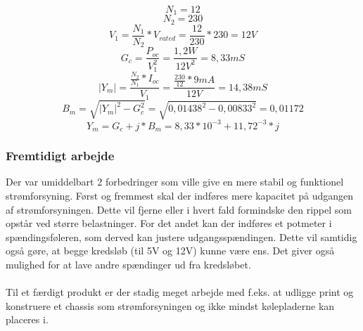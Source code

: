 \begin{equation}
	N_1 = 12
\end{equation}
\begin{equation}
	N_2 = 230
\end{equation}
\begin{equation}
	V_1 = \frac{N_1}{N_2} * V_{rated} = \frac{12}{230} * 230 = 12V
\end{equation}
\begin{equation}
	G_c = \frac{P_{oc}}{V_1^2} = \frac{1,2W}{12V^2} = 8,33mS
\end{equation}
\begin{equation}
	\left|Y_m\right| = \frac{\frac{N_2}{N_1} * I_{oc}}{V_1} = \frac{\frac{230}{12} * 9mA}{12V} = 14,38mS
\end{equation}
\begin{equation}
	B_m = \sqrt{\left|Y_m\right|^2 - G_c^2} = \sqrt{0,01438^2 - 0,00833^2} = 0,01172
\end{equation}
\begin{equation}
	Y_m = G_c + j * B_m = 8,33*10^{-3} + 11,72^{-3} * j
\end{equation}


\subsubsection{Fremtidigt arbejde}
Der var umiddelbart 2 forbedringer som ville give en mere stabil og funktionel strømforsyning. Først og fremmest skal der indføres mere kapacitet på udgangen af strømforsyningen. Dette vil fjerne eller i hvert fald formindske den rippel som opstår ved større belastninger. For det andet kan der indføres et potmeter i spændingsføleren, som derved kan justere udgangsspændingen. Dette vil samtidig også gøre, at begge kredsløb (til 5V og 12V) kunne være ens. Det giver også mulighed for at lave andre spændinger ud fra kredsløbet.
\\\\
Til et færdigt produkt er der stadig meget arbejde med f.eks. at udligge print og konstruere et chassis som strømforsyningen og ikke mindst kølepladerne kan placeres i.
